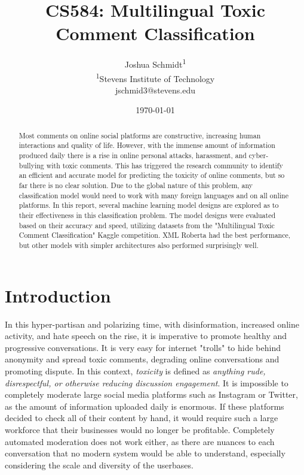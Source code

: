 \documentclass{article}
\title{CS584: Multilingual Toxic Comment Classification} %
\author{
Joshua Schmidt\textsuperscript{1}\\
\textsuperscript{1}{Stevens Institute of Technology}\\
jschmid3@stevens.edu
}
\date{\today}
\begin{document}
\maketitle
\begin{abstract}

Most comments on online social platforms are constructive, increasing human interactions and quality of life. However, with the immense amount of information produced daily there is a rise in online personal attacks, harassment, and cyber-bullying with toxic comments. This has triggered the research community to identify an efficient and accurate model for predicting the toxicity of online comments, but so far there is no clear solution. Due to the global nature of this problem, any classification model would need to work with many foreign languages and on all online platforms. In this report, several machine learning model designs are explored as to their effectiveness in this classification problem. The model designs were evaluated based on their accuracy and speed, utilizing datasets from the "Multilingual Toxic Comment Classification" Kaggle competition. XML Roberta had the best performance, but other models with simpler architectures also performed surprisingly well.

\end{abstract}

\section{Introduction}

In this hyper-partisan and polarizing time, with disinformation, increased online activity, and hate speech on the rise, it is imperative to promote healthy and progressive conversations. It is very easy for internet "trolls" to hide behind anonymity and spread toxic comments, degrading online conversations and promoting dispute. In this context, \textit{toxicity} is defined as \textit{anything rude, disrespectful, or otherwise reducing discussion engagement}. It is impossible to completely moderate large social media platforms such as Instagram or Twitter, as the amount of information uploaded daily is enormous. If these platforms decided to check all of their content by hand, it would require such a large workforce that their businesses would no longer be profitable. Completely automated moderation does not work either, as there are nuances to each conversation that no modern system would be able to understand, especially considering the scale and diversity of the userbases.
\end{document}
